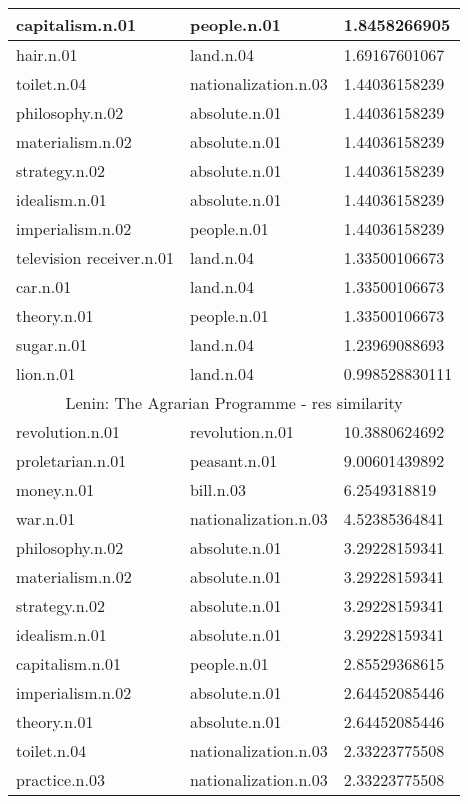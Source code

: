 \begin{center}
\begin{tabular}{ | l | l | l |}
capitalism.n.01 & people.n.01 & 1.8458266905 \\ \hline
hair.n.01 & land.n.04 & 1.69167601067 \\ \hline
toilet.n.04 & nationalization.n.03 & 1.44036158239 \\ \hline
philosophy.n.02 & absolute.n.01 & 1.44036158239 \\ \hline
materialism.n.02 & absolute.n.01 & 1.44036158239 \\ \hline
strategy.n.02 & absolute.n.01 & 1.44036158239 \\ \hline
idealism.n.01 & absolute.n.01 & 1.44036158239 \\ \hline
imperialism.n.02 & people.n.01 & 1.44036158239 \\ \hline
television receiver.n.01 & land.n.04 & 1.33500106673 \\ \hline
car.n.01 & land.n.04 & 1.33500106673 \\ \hline
theory.n.01 & people.n.01 & 1.33500106673 \\ \hline
sugar.n.01 & land.n.04 & 1.23969088693 \\ \hline
lion.n.01 & land.n.04 & 0.998528830111 \\ \hline
\multicolumn{3}{|c|}{Lenin: The Agrarian Programme  - res similarity} \\ \hline
revolution.n.01 & revolution.n.01 & 10.3880624692 \\ \hline
proletarian.n.01 & peasant.n.01 & 9.00601439892 \\ \hline
money.n.01 & bill.n.03 & 6.2549318819 \\ \hline
war.n.01 & nationalization.n.03 & 4.52385364841 \\ \hline
philosophy.n.02 & absolute.n.01 & 3.29228159341 \\ \hline
materialism.n.02 & absolute.n.01 & 3.29228159341 \\ \hline
strategy.n.02 & absolute.n.01 & 3.29228159341 \\ \hline
idealism.n.01 & absolute.n.01 & 3.29228159341 \\ \hline
capitalism.n.01 & people.n.01 & 2.85529368615 \\ \hline
imperialism.n.02 & absolute.n.01 & 2.64452085446 \\ \hline
theory.n.01 & absolute.n.01 & 2.64452085446 \\ \hline
toilet.n.04 & nationalization.n.03 & 2.33223775508 \\ \hline
practice.n.03 & nationalization.n.03 & 2.33223775508 \\ \hline

\end{tabular}
\end{center}
